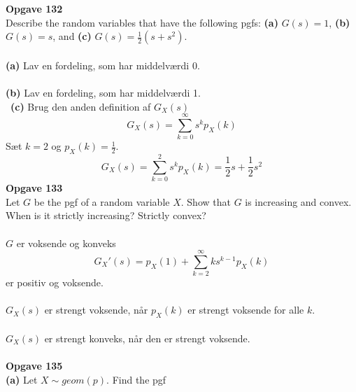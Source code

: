 \documentclass[12pt,a4paper,draft]{report}
\author{Frederik Appel Vardinghus-Nielsen}
\begin{document}
\noindent\textbf{Opgave 132}\\
Describe the random variables that have the following pgfs: \textbf{(a)} $G(s)=1$, \textbf{(b)} $G(s)=s$, and \textbf{(c)} $G(s)=\frac{1}{2}(s+s^2)$.\\\\
\textbf{(a)} Lav en fordeling, som har middelværdi 0.\\\\
\textbf{(b)} Lav en fordeling, som har middelværdi 1.\\\
\textbf{(c)} Brug den anden definition af $G_X(s)$
\begin{equation}
G_X(s)=\sum_{k=0}^{\infty}s^kp_X(k)
\end{equation}
Sæt $k=2$ og $p_X(k)=\frac{1}{2}$.
\begin{equation}
G_X(s)=\sum_{k=0}^2s^kp_X(k)=\frac{1}{2}s+\frac{1}{2}s^2
\end{equation}
\textbf{Opgave 133}\\
Let $G$ be the pgf of a random variable $X$. Show that $G$ is increasing and convex. When is it strictly increasing? Strictly convex?\\\\
$G$ er voksende og konveks
\begin{equation}
G_X'(s)=p_X(1)+\sum_{k=2}^{\infty}ks^{k-1}p_X(k)
\end{equation}
er positiv og voksende.\\\\
$G_X(s)$ er strengt voksende, når $p_X(k)$ er strengt voksende for alle $k$.\\\\
$G_X(s)$ er strengt konveks, når den er strengt voksende.\\\\
\textbf{Opgave 135}\\
\textbf{(a)} Let $X\sim geom(p)$. Find the pgf 
\end{document}
